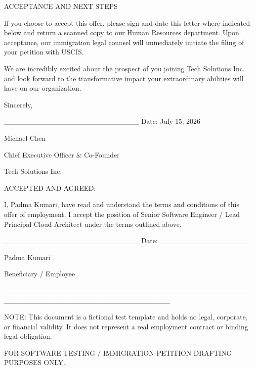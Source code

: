 ACCEPTANCE AND NEXT STEPS

If you choose to accept this offer, please sign and date this letter where indicated below and return a scanned copy to our Human Resources department. Upon acceptance, our immigration legal counsel will immediately initiate the filing of your petition with USCIS.

We are incredibly excited about the prospect of you joining Tech Solutions Inc. and look forward to the transformative impact your extraordinary abilities will have on our organization.

Sincerely,

\_\_\_\_\_\_\_\_\_\_\_\_\_\_\_\_\_\_\_\_\_\_\_\_\_\_                  Date: July 15, 2026

Michael Chen

Chief Executive Officer \& Co-Founder

Tech Solutions Inc.

ACCEPTED AND AGREED:

I, Padma Kumari, have read and understand the terms and conditions of this offer of employment. I accept the position of Senior Software Engineer / Lead Principal Cloud Architect under the terms outlined above.

\_\_\_\_\_\_\_\_\_\_\_\_\_\_\_\_\_\_\_\_\_\_\_\_\_\_                  Date: \_\_\_\_\_\_\_\_\_\_\_\_\_\_\_\_\_

Padma Kumari

Beneficiary / Employee

\_\_\_\_\_\_\_\_\_\_\_\_\_\_\_\_\_\_\_\_\_\_\_\_\_\_\_\_\_\_\_\_\_\_\_\_\_\_\_\_\_\_\_\_\_\_\_\_\_\_\_\_\_\_\_\_\_\_\_\_\_\_\_\_\_\_\_\_\_\_\_\_\_\_\_\_\_\_\_\_

NOTE: This document is a fictional test template and holds no legal, corporate, or financial validity. It does not represent a real employment contract or binding legal obligation.

FOR SOFTWARE TESTING / IMMIGRATION PETITION DRAFTING PURPOSES ONLY.